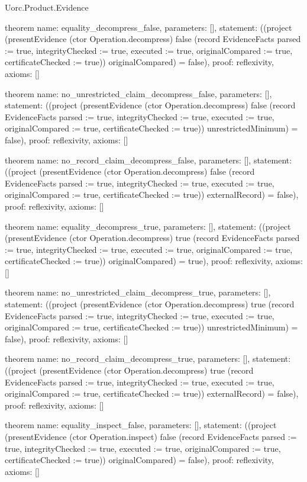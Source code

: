 \begin{lexlean}{Uorc.Product.Evidence}
\begin{semanticmodule}
theorem{
  name: equality_decompress_false,
  parameters: [],
  statement: ((project (presentEvidence (ctor Operation.decompress) false (record EvidenceFacts {parsed := true, integrityChecked := true, executed := true, originalCompared := true, certificateChecked := true})) originalCompared) = false),
  proof: reflexivity{},
  axioms: []
}

theorem{
  name: no_unrestricted_claim_decompress_false,
  parameters: [],
  statement: ((project (presentEvidence (ctor Operation.decompress) false (record EvidenceFacts {parsed := true, integrityChecked := true, executed := true, originalCompared := true, certificateChecked := true})) unrestrictedMinimum) = false),
  proof: reflexivity{},
  axioms: []
}

theorem{
  name: no_record_claim_decompress_false,
  parameters: [],
  statement: ((project (presentEvidence (ctor Operation.decompress) false (record EvidenceFacts {parsed := true, integrityChecked := true, executed := true, originalCompared := true, certificateChecked := true})) externalRecord) = false),
  proof: reflexivity{},
  axioms: []
}

theorem{
  name: equality_decompress_true,
  parameters: [],
  statement: ((project (presentEvidence (ctor Operation.decompress) true (record EvidenceFacts {parsed := true, integrityChecked := true, executed := true, originalCompared := true, certificateChecked := true})) originalCompared) = true),
  proof: reflexivity{},
  axioms: []
}

theorem{
  name: no_unrestricted_claim_decompress_true,
  parameters: [],
  statement: ((project (presentEvidence (ctor Operation.decompress) true (record EvidenceFacts {parsed := true, integrityChecked := true, executed := true, originalCompared := true, certificateChecked := true})) unrestrictedMinimum) = false),
  proof: reflexivity{},
  axioms: []
}

theorem{
  name: no_record_claim_decompress_true,
  parameters: [],
  statement: ((project (presentEvidence (ctor Operation.decompress) true (record EvidenceFacts {parsed := true, integrityChecked := true, executed := true, originalCompared := true, certificateChecked := true})) externalRecord) = false),
  proof: reflexivity{},
  axioms: []
}

theorem{
  name: equality_inspect_false,
  parameters: [],
  statement: ((project (presentEvidence (ctor Operation.inspect) false (record EvidenceFacts {parsed := true, integrityChecked := true, executed := true, originalCompared := true, certificateChecked := true})) originalCompared) = false),
  proof: reflexivity{},
  axioms: []
}


\end{semanticmodule}
\end{lexlean}
